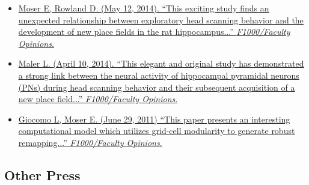 \documentclass[10pt]{article}
\newcommand{\itemtitle}[1]{{\color{hopkinsblue}\ul{#1}}}
\begin{document}
\begin{itemize}
  \item \href{https://facultyopinions.com/prime/718333676#eval793494783}
    {Moser E, Rowland D. (May 12, 2014). ``\itemtitle{This exciting study finds
        an unexpected relationship between exploratory head scanning behavior
      and the development of new place fields in the rat hippocampus...}”
    \emph{F1000/Faculty Opinions}.}
  \item \href{https://facultyopinions.com/prime/718333676#eval793493493}
    {Maler L. (April 10, 2014). ``\itemtitle{This elegant and original study has
        demonstrated a strong link between the neural activity of hippocampal pyramidal
        neurons (PNs) during head scanning behavior and their subsequent acquisition of
    a new place field...}'' \emph{F1000/Faculty Opinions}.}
  \item \href{https://facultyopinions.com/prime/11553956}
    {Giocomo L, Moser E. (June 29, 2011) ``\itemtitle{This paper presents an
        interesting computational model which utilizes grid-cell modularity to generate
    robust remapping...}'' \emph{F1000/Faculty Opinions}.}
\end{itemize}

\subsection*{Other Press}
\label{sec:press}
\end{document}
